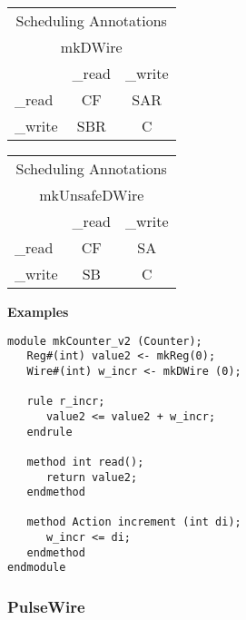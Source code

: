 \begin{center}
\begin{tabular}{|p{.75 in}|c|c|}
\hline
\multicolumn{3}{|c|}{Scheduling Annotations}\\
\multicolumn{3}{|c|}{mkDWire}\\
\hline
&{\_read}&{\_write}\\
\hline
\hline
{\_read}&CF&SAR\\
\hline
{\_write}&SBR& C\\
\hline
\hline
\end{tabular}
\hmm\begin{tabular}{|p{.75 in}|c|c|}
\hline
\multicolumn{3}{|c|}{Scheduling Annotations}\\
\multicolumn{3}{|c|}{mkUnsafeDWire}\\
\hline
&{\_read}&{\_write}\\
\hline
\hline
{\_read}&CF&SA\\
\hline
{\_write}&SB& C\\
\hline
\hline
\end{tabular}
\end{center}

{\bf Examples}
\begin{verbatim}
module mkCounter_v2 (Counter);
   Reg#(int) value2 <- mkReg(0); 
   Wire#(int) w_incr <- mkDWire (0); 

   rule r_incr;
      value2 <= value2 + w_incr;
   endrule

   method int read();
      return value2;
   endmethod

   method Action increment (int di);
      w_incr <= di;
   endmethod
endmodule
\end{verbatim}

\subsubsection{PulseWire}





